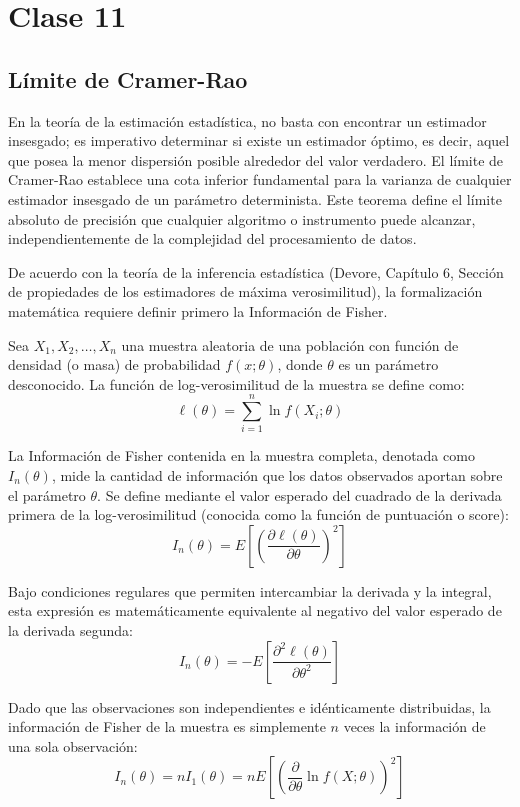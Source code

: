 \chapter{Clase 11}

\section{Límite de Cramer-Rao}

En la teoría de la estimación estadística, no basta con encontrar un estimador insesgado; es imperativo determinar si existe un estimador óptimo, es decir, aquel que posea la menor dispersión posible alrededor del valor verdadero. El límite de Cramer-Rao establece una cota inferior fundamental para la varianza de cualquier estimador insesgado de un parámetro determinista. Este teorema define el límite absoluto de precisión que cualquier algoritmo o instrumento puede alcanzar, independientemente de la complejidad del procesamiento de datos.

De acuerdo con la teoría de la inferencia estadística (Devore, Capítulo 6, Sección de propiedades de los estimadores de máxima verosimilitud), la formalización matemática requiere definir primero la Información de Fisher. 

Sea $X_1, X_2, \dots, X_n$ una muestra aleatoria de una población con función de densidad (o masa) de probabilidad $f(x; \theta)$, donde $\theta$ es un parámetro desconocido. La función de log-verosimilitud de la muestra se define como:
$$ \ell(\theta) = \sum_{i=1}^{n} \ln f(X_i; \theta) $$

La Información de Fisher contenida en la muestra completa, denotada como $I_n(\theta)$, mide la cantidad de información que los datos observados aportan sobre el parámetro $\theta$. Se define mediante el valor esperado del cuadrado de la derivada primera de la log-verosimilitud (conocida como la función de puntuación o score):
$$ I_n(\theta) = E\left[ \left( \frac{\partial \ell(\theta)}{\partial \theta} \right)^2 \right] $$

Bajo condiciones regulares que permiten intercambiar la derivada y la integral, esta expresión es matemáticamente equivalente al negativo del valor esperado de la derivada segunda:
$$ I_n(\theta) = -E\left[ \frac{\partial^2 \ell(\theta)}{\partial \theta^2} \right] $$

Dado que las observaciones son independientes e idénticamente distribuidas, la información de Fisher de la muestra es simplemente $n$ veces la información de una sola observación:
$$ I_n(\theta) = n I_1(\theta) = n E\left[ \left( \frac{\partial}{\partial \theta} \ln f(X; \theta) \right)^2 \right] $$


